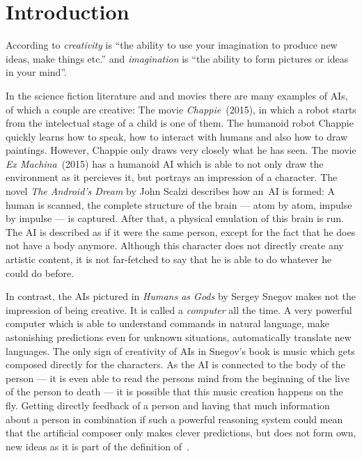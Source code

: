 
\section{Introduction}
\label{sec:introduction}
According to \cite{LongmanDCE06} \textit{creativity} is \enquote{the ability to
use your imagination to produce new ideas, make things etc.} and
\textit{imagination} is \enquote{the ability to form pictures or ideas in your
mind}.

In the science fiction literature and and movies there are many examples of
\glspl{AI}, of which a couple are creative: The movie
\textit{Chappie}~(2015), in which a robot starts from the intelectual stage of
a child is one of them. The humanoid robot Chappie quickly learns how to speak,
how to interact with humans and also how to draw paintings. However, Chappie
only draws very closely what he has seen. The movie
\textit{Ex Machina}~(2015) has a humanoid \gls{AI} which is able to not only
draw the environment as it percieves it, but portrays an impression of a
character. The novel \textit{The Android's Dream} by John Scalzi describes how
an~\gls{AI} is formed: A human is scanned, the complete structure of the brain
--- atom by atom, impulse by impulse --- is captured. After that, a physical
emulation of this brain is run. The \gls{AI} is described as if it were the
same person, except for the fact that he does not have a body anymore. Although
this character does not directly create any artistic content, it is not
far-fetched to say that he is able to do whatever he could do before.

In contrast, the \glspl{AI} pictured in \textit{Humans as Gods} by Sergey
Snegov makes not the impression of being creative. It is called a
\textit{computer} all the time. A very powerful computer which is able to
understand commands in natural language, make astonishing predictions even for
unknown situations, automatically translate new languages. The only sign of
creativity of \glspl{AI} in Snegov's book is music which gets composed directly
for the characters. As the \gls{AI} is connected to the body of the person ---
it is even able to read the persons mind from the beginning of the live of the
person to death --- it is possible that this music creation happens on the fly.
Getting directly feedback of a person and having that much information about
a person in combination if such a powerful reasoning system could mean that the
artificial composer only makes clever predictions, but does not form own, new
ideas as it is part of the definition of~\cite{LongmanDCE06}.

